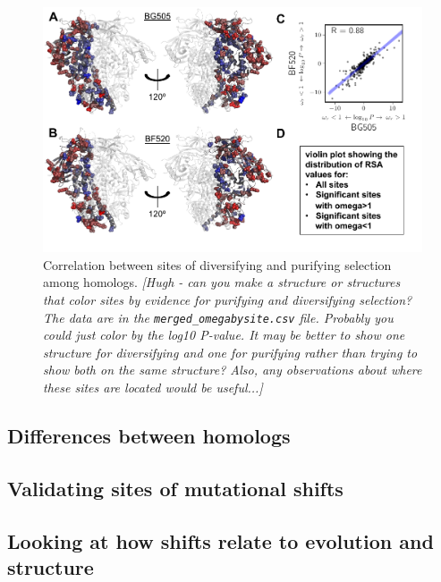 \documentclass[9pt,lineno]{elife}
\newcommand{\jdbcomment}[1]{\emph{\color{red} [#1]}}
\begin{document}
\begin{figure}
\includegraphics[width=1.0\textwidth]{figures/omegabysite_structural_analysis/omegabysite_structural_analysis.pdf}
\caption{\label{fig:divselcorr}
Correlation between sites of diversifying and purifying selection among homologs.
\jdbcomment{Hugh - can you make a structure or structures that color sites by evidence for purifying and diversifying selection? The data are in the \texttt{merged\_omegabysite.csv} file. Probably you could just color by the log10 P-value. It may be better to show one structure for diversifying and one for purifying rather than trying to show both on the same structure? Also, any observations about where these sites are located would be useful...}  
}
\end{figure}
\FloatBarrier


\subsection*{Differences between homologs}


\subsection*{Validating sites of mutational shifts}

\subsection*{Looking at how shifts relate to evolution and structure}
\end{document}
